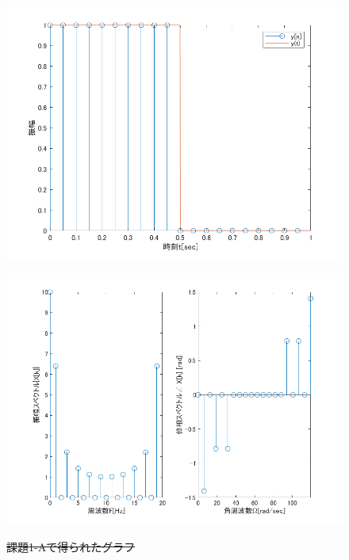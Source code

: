 \documentclass[11pt, a4paper, titlepage]{ltjsarticle}
\begin{document}
\begin{figure}[h]
\begin{center}
\begin{minipage}[t]{0.48\columnwidth}
    \includegraphics[width=\columnwidth]{figures/sampling1-A.png}
    \label{fign:sa1-A}
\end{minipage}
\begin{minipage}[t]{0.48\columnwidth}
    \includegraphics[width=\columnwidth]{figures/spectrum1-A.png}
    \label{fign:sp1-A}
\end{minipage}
\end{center}
\caption{\sout{課題1-Aで得られたグラフ}}
\end{figure}
\end{document}
